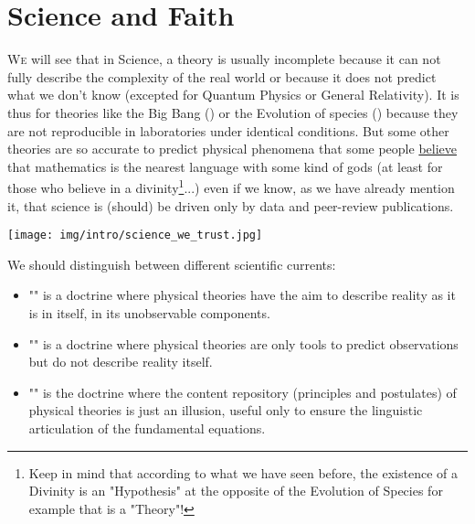 	\newpage
	\thispagestyle{empty}
	\mbox{}
	\section{Science and Faith}
	\lettrine[lines=4]{\color{BrickRed}W}{e} will see that in Science, a theory is usually incomplete because it can not fully describe the complexity of the real world or because it does not predict what we don't know (excepted for Quantum Physics or General Relativity). It is thus for theories like the Big Bang () or the Evolution of species () because they are not reproducible in laboratories under identical conditions.  But some other theories are so accurate to predict physical phenomena that some people \underline{believe} that mathematics is the nearest language with some kind of gods (at least for those who believe in a divinity\footnote{Keep in mind that according to what we have seen before, the existence of a Divinity is an "Hypothesis" at the opposite of the Evolution of Species for example that is a "Theory"!}...) even if we know, as we have already mention it, that science is (should) be driven only by data and peer-review publications.
	\begin{center}
		\texttt{[image: img/intro/science\_we\_trust.jpg]}
	\end{center}	

	We should distinguish between different scientific currents: 
	\begin{itemize}
		\item "" is a doctrine where physical theories have the aim to describe reality as it is in itself, in its unobservable components. 
	
		\item "" is a doctrine where physical theories are only tools to predict observations but do not describe reality itself. 
	
		\item "" is the doctrine where the content repository (principles and postulates) of physical theories is just an illusion, useful only to ensure the linguistic articulation of the fundamental equations. 
	\end{itemize}

